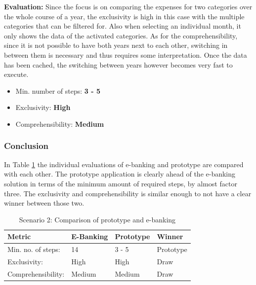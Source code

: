 \textbf{Evaluation:} Since the focus is on comparing the expenses for two categories over the whole course of a year, the exclusivity is high in this case with the multiple categories that can be filtered for. Also when selecting an individual month, it only shows the data of the activated categories. As for the comprehensibility, since it is not possible to have both years next to each other, switching in between them is necessary and thus requires some interpretation. Once the data has been cached, the switching between years however becomes very fast to execute.
\begin{itemize}[noitemsep,nolistsep]
	\item Min. number of steps: \textbf{3 - 5}
	\item Exclusivity: \textbf{High}
	\item Comprehensibility: \textbf{Medium}
\end{itemize}



\subsubsection{Conclusion}

In Table \ref{tbl:scenariotwocomparison} the individual evaluations of e-banking and prototype are compared with each other. The prototype application is clearly ahead of the e-banking solution in terms of the minimum amount of required steps, by almost factor three. The exclusivity and comprehensibility is similar enough to not have a clear winner between those two.
\begin{table}[h]
	\begin{center}
		\begin{tabular}{ | p{3.2cm} | p{3.8cm} | p{3.5cm} | p{2.5cm} | }
			\hline
			\textbf{Metric} & \textbf{E-Banking} & \textbf{Prototype} & \textbf{Winner} \\
			\hline
			Min. no. of steps: & 14 & 3 - 5 & Prototype \\
			\hline
			Exclusivity: & High & High & Draw \\
			\hline
			Comprehensibility: & Medium & Medium & Draw \\
			\hline
		\end{tabular}
		\caption{Scenario 2: Comparison of prototype and e-banking}
		\label{tbl:scenariotwocomparison}
	\end{center}
\end{table}


